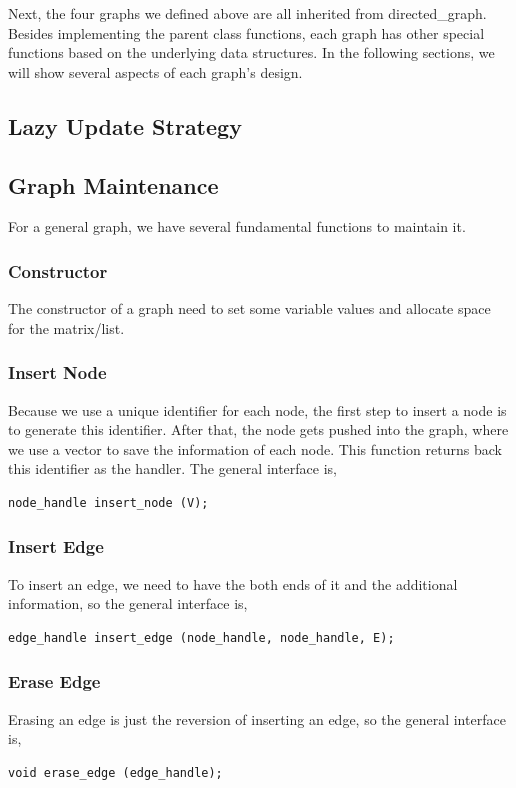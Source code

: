 \documentclass[]{article}
\begin{document}
Next, the four graphs we defined above are all inherited from directed\_graph. Besides implementing the parent class functions, each graph has other special functions based on the underlying data structures. In the following sections, we will show several aspects of each graph's design.
\subsection {Lazy Update Strategy}


\subsection{Graph Maintenance} 
For a general graph, we have several fundamental functions to maintain it.

\subsubsection {Constructor}
The constructor of a graph need to set some variable values and allocate space for the matrix/list.
\subsubsection {Insert Node}
Because we use a unique identifier for each node, the first step to insert a node is to generate this identifier. After that, the node gets pushed into the graph, where we use a vector to save the information of each node. This function returns back this identifier as the handler. The general interface is,
\begin{lstlisting}
node_handle insert_node (V);
\end{lstlisting}
\subsubsection {Insert Edge}
To insert an edge, we need to have the both ends of it and the additional information, so the general interface is,
\begin{lstlisting}
edge_handle insert_edge (node_handle, node_handle, E);
\end{lstlisting}
\subsubsection {Erase Edge}
Erasing an edge is just the reversion of inserting an edge, so the general interface is,
\begin{lstlisting}
void erase_edge (edge_handle);
\end{lstlisting}
\end{document}
